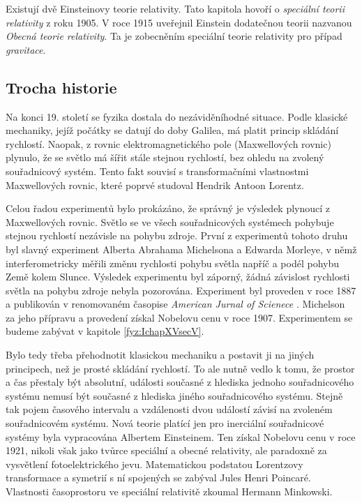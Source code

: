     Existují dvě Einsteinovy teorie relativity. Tato kapitola hovoří o \emph{speciální teorii 
    relativity} z roku \num{1905}. V roce \num{1915} uveřejnil Einstein dodatečnou teorii nazvanou 
    \emph{Obecná teorie relativity}. Ta je zobecněním speciální teorie relativity pro případ 
    \emph{gravitace}.

    \subsection{Trocha historie}
      Na konci 19. století se fyzika dostala do nezáviděníhodné situace. Podle klasické mechaniky,
      jejíž počátky se datují do doby Galilea, má platit princip skládání rychlostí. Naopak, z
      rovnic elektromagnetického pole (Maxwellových rovnic) plynulo, že se světlo má šířit stále
      stejnou rychlostí, bez ohledu na zvolený souřadnicový systém. Tento fakt souvisí s
      transformačními vlastnostmi Maxwellových rovnic, které poprvé studoval Hendrik Antoon Lorentz.


      Celou řadou experimentů bylo prokázáno, že správný je výsledek plynoucí z Maxwellových rovnic.
      Světlo se ve všech souřadnicových systémech pohybuje stejnou rychlostí nezávisle na pohybu
      zdroje. První z experimentů tohoto druhu byl slavný experiment Alberta Abrahama Michelsona a
      Edwarda Morleye, v němž interferometricky měřili změnu rychlosti pohybu světla napříč a podél
      pohybu Země kolem Slunce. Výsledek experimentu byl záporný, žádná závislost rychlosti světla
      na pohybu zdroje nebyla pozorována. Experiment byl proveden v roce 1887 a publikován v
      renomovaném časopise \emph{American Jurnal of Scienece} \cite[s.~22]{MichelMorl1887}.
      Michelson za jeho přípravu a provedení získal Nobelovu cenu v roce 1907. Experimentem se
      budeme zabývat v kapitole \ref{fyz:IchapXVsecV}. 

      Bylo tedy třeba přehodnotit klasickou mechaniku a postavit ji na jiných principech, než je
      prosté skládání rychlostí. To ale nutně vedlo k tomu, že prostor a čas přestaly být absolutní,
      události současné z hlediska jednoho souřadnicového systému nemusí být současné z hlediska
      jiného souřadnicového systému. Stejně tak pojem časového intervalu a vzdálenosti dvou událostí
      závisí na zvoleném souřadnicovém systému. Nová teorie platící jen pro inerciální souřadnicové
      systémy byla vypracována Albertem Einsteinem. Ten získal Nobelovu cenu v roce 1921, nikoli
      však jako tvůrce speciální a obecné relativity, ale paradoxně za vysvětlení fotoelektrického
      jevu. Matematickou podstatou Lorentzovy transformace a symetrií s ní spojených se zabýval
      Jules Henri Poincaré. Vlastnosti časoprostoru ve speciální relativitě zkoumal Hermann
      Minkowski.

